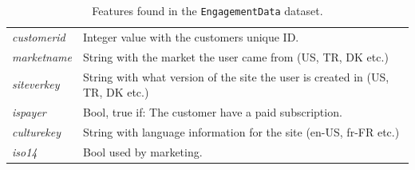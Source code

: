 \begin{table}[H]
\begin{tabularx}{\textwidth}{l|X}
		\textit{customerid}                      & Integer value with the customers unique ID.                                                                \\
		\textit{marketname}                      & String with the market the user came from (US, TR, DK etc.)                                                \\
		\textit{siteverkey}                      & String with what version of the site the user is created in (US, TR, DK etc.)                              \\
		\textit{ispayer}                         & Bool, true if: The customer have a paid subscription.                                                      \\
		\textit{culturekey}                      & String with language information for the site (en-US, fr-FR etc.)                                          \\
		\textit{iso14}                           & Bool used by marketing.
	\end{tabularx}
	\caption{Features found in the \texttt{EngagementData} dataset.}
	\label{tab:engdatalayout}
\end{table}


